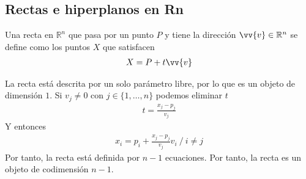 \documentclass{../Calculo.tex}
\begin{document}
\subsection{Rectas e hiperplanos en Rn}
Una recta en $\mathbb{R}^{n}$ que pasa por un punto $P$ y tiene la dirección
$\vv{v} \in \mathbb{R}^{n}$ se define como los puntos $X$ que satisfacen
\begin{equation}
	\begin{split}
		X = P+t\vv{v}
	\end{split}
\end{equation}
\begin{center}
	


\end{center}
La recta está descrita por un solo parámetro libre, por lo que es un objeto de
dimensión $1$. Si $v_{j}\neq 0$ con $j \in \{ 1,\dots ,n \}$  podemos eliminar $t$
\begin{equation}
	\begin{split}
		t = \frac{x_{j}-p_{j}}{v_{j}}
	\end{split}
\end{equation}
Y entonces
\begin{equation}
	\begin{split}
		x_{i} = p_{i} +\frac{x_{j}-p_{j}}{v_{j}}v_{i} ~/~ i \neq j
	\end{split}
\end{equation}
Por tanto, la recta está definida por $n-1$ ecuaciones. Por tanto, la recta
es un objeto de codimensión $n-1$. 
\end{document}
